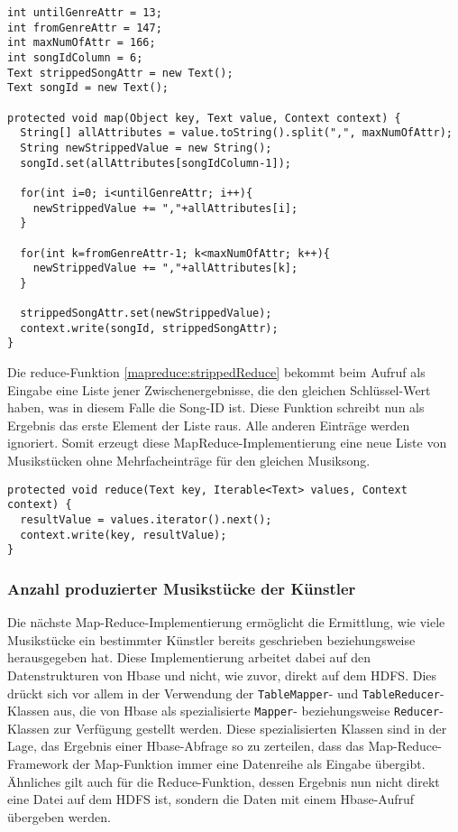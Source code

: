 
\begin{lstlisting}[caption={Map-Funktion zur Entfernung von mehrfachen Musikeinträgen}, label=mapreduce:strippedMap]
int untilGenreAttr = 13;
int fromGenreAttr = 147;
int maxNumOfAttr = 166;
int songIdColumn = 6;
Text strippedSongAttr = new Text();
Text songId = new Text();

protected void map(Object key, Text value, Context context) {
  String[] allAttributes = value.toString().split(",", maxNumOfAttr);
  String newStrippedValue = new String();
  songId.set(allAttributes[songIdColumn-1]);
      
  for(int i=0; i<untilGenreAttr; i++){
    newStrippedValue += ","+allAttributes[i];
  }
      
  for(int k=fromGenreAttr-1; k<maxNumOfAttr; k++){
    newStrippedValue += ","+allAttributes[k];
  }
      
  strippedSongAttr.set(newStrippedValue);
  context.write(songId, strippedSongAttr);
}
\end{lstlisting}

Die reduce-Funktion \ref{mapreduce:strippedReduce} bekommt beim Aufruf als Eingabe eine Liste jener Zwischenergebnisse, die den gleichen 
Schlüssel-Wert haben, was in diesem Falle die Song-ID ist. 
Diese Funktion schreibt nun als Ergebnis das erste Element der Liste raus. Alle anderen
Einträge werden ignoriert. Somit erzeugt diese MapReduce-Implementierung eine neue Liste
von Musikstücken ohne Mehrfacheinträge für den gleichen Musiksong.

\begin{lstlisting}[caption={Reduce-Funktion zur Entfernung von mehrfachen Musikeinträgen}, label=mapreduce:strippedReduce]
protected void reduce(Text key, Iterable<Text> values, Context context) {
  resultValue = values.iterator().next();
  context.write(key, resultValue);
}
\end{lstlisting}


\subsubsection{Anzahl produzierter Musikstücke der Künstler}
Die nächste Map-Reduce-Implementierung ermöglicht die Ermittlung, wie viele 
Musikstücke ein bestimmter Künstler bereits geschrieben beziehungsweise herausgegeben
hat. Diese Implementierung arbeitet dabei auf den Datenstrukturen von Hbase und nicht,
wie zuvor, direkt auf dem HDFS. Dies drückt sich vor allem in der Verwendung der 
\texttt{TableMapper}- und \texttt{TableReducer}-Klassen aus, die von Hbase als spezialisierte \texttt{Mapper}- beziehungsweise \texttt{Reducer}-Klassen zur Verfügung gestellt werden.
Diese spezialisierten Klassen sind in der Lage, das Ergebnis einer Hbase-Abfrage so zu
zerteilen, dass das Map-Reduce-Framework der Map-Funktion immer eine Datenreihe 
als Eingabe übergibt. Ähnliches gilt auch für die Reduce-Funktion, dessen Ergebnis
nun nicht direkt eine Datei auf dem HDFS ist, sondern die Daten mit einem Hbase-Aufruf übergeben
werden.

